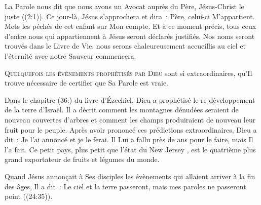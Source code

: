 
La Parole nous dit que \og nous
 avons un Avocat auprès du Père, Jésus-Christ le juste \fg{}
 ((2:1)).
 Ce jour-là, Jésus s'approchera et dira~: 
 \og Père, celui-ci M'appartient. Mets les péchés de cet enfant
 sur Mon compte. \fg{}
 Et à ce moment précis, tous ceux d'entre nous qui appartiennent à Jésus
 seront déclarés justifiés. Nos noms seront trouvés dans le Livre de Vie,
 nous serons chaleureusement accueillis au ciel et l'éternité
 avec notre Sauveur commencera. 

\dvrule







\lettrine{Q}{uelquefois les évènements prophétisés par Dieu}
 sont si extraordinaires, qu'Il trouve nécessaire de certifier
 que Sa Parole est vraie. 

Dans le chapitre (36:) du livre d'Ézechiel, Dieu a prophétisé
 le re-développement de la terre d'Israël.
 Il a décrit comment les montagnes dénudées seraient de nouveau couvertes
 d'arbres et comment les 
 champs produiraient de nouveau leur fruit pour le peuple.
 Après avoir prononcé ces prédictions extraordinaires,
 Dieu a dit~: 
 \og Je l'ai annoncé et je le ferai. \fg{}
 Il Lui a fallu près de  ans pour le faire, mais Il l'a fait.
 Ce petit pays, plus petit que l'état du New Jersey ,
 est le quatrième plus grand exportateur de fruits et légumes du monde. 


Quand Jésus annonçait à Ses disciples les évènements
 qui allaient arriver à la fin des âges, Il a dit~: 
 \og Le ciel et la terre passeront, mais mes paroles ne passeront point \fg{}
 ((24:35)). 

